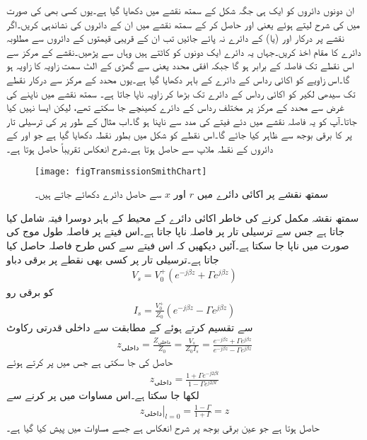 ان دونوں دائروں کو ایک ہی جگہ شکل  کے سمتھ نقشے میں دکھایا گیا ہے۔یوں کسی بھی  کی صورت میں  کی شرح لیتے ہوئے  یعنی  اور  حاصل کر کے  سمتھ نقشے میں ان کے دائروں کی نشاندہی کریں۔اگر نقشے پر درکار  اور (یا)  کے دائرے نہ پائے جائیں تب ان کے قریبی قیمتوں کے دائروں سے مطلوبہ دائرے کا مقام اخذ کریں۔جہاں یہ دائرے  ایک دونوں کو کاٹتے ہیں وہاں سے   پڑھیں۔نقشے  کے مرکز  سے  اس نقطے تک فاصلہ  کے برابر ہو گا جبکہ افقی محدد یعنی  سے گھڑی کے الٹ سمت زاویہ  کا زاویہ ہو گا۔اس زاویے کو اکائی رداس کے دائرے کے باہر دکھایا گیا ہے۔یوں محدد کے مرکز سے درکار نقطے تک سیدھی لکیر کو اکائی رداس کے دائرے تک بڑھا کر زاویہ ناپا جاتا ہے۔ سمتھ نقشے میں  ناپنے کی غرض سے محدد کے مرکز  پر مختلف رداس کے دائرے کھینچے جا سکتے تھے، لیکن ایسا نہیں کیا جاتا۔آپ کو یہ فاصلہ نقشے میں دئے فیتے کی مدد سے ناپنا ہو گا۔اب مثال کے طور پر  کی ترسیلی تار پر  کا برقی بوجھ  سے ظاہر کیا جائے گا۔اس نقطے کو شکل میں بطور نقطہ  دکھایا گیا ہے جو  اور  کے دائروں کے نقطہ ملاپ سے حاصل ہوتا ہے۔شرح انعکاس تقریباً   حاصل ہوتا ہے۔
\begin{figure}
\centering
\texttt{[image: figTransmissionSmithChart]}
\caption{سمتھ نقشے پر اکائی دائرے میں $r$ اور $x$ سے حاصل دائرے دکھائے جاتے ہیں۔}
\label{شکل_ترسیلی_سمتھ-نقشہ_پ}
\end{figure}

سمتھ نقشہ مکمل کرنے کی خاطر اکائی دائرے کے  محیط کے باہر دوسرا فیتہ شامل کیا جاتا ہے جس سے ترسیلی تار پر فاصلہ ناپا جاتا ہے۔اس فیتے پر فاصلہ طول موج  کی صورت میں ناپا جا سکتا ہے۔آئیں دیکھیں کہ اس فیتے سے کس طرح فاصلہ حاصل کیا جاتا ہے۔ترسیلی تار پر کسی بھی نقطے پر برقی دباو
\begin{align*}
V_s=V_0^+ \left(e^{-j\beta z}+\Gamma e^{j \beta z} \right)
\end{align*}
کو برقی رو
\begin{align*}
I_s =\frac{V_0^+}{Z_0}\left(e^{-j\beta z}-\Gamma e^{j \beta z} \right)
\end{align*}
سے تقسیم کرتے ہوئے  کے مطابقت سے داخلی قدرتی رکاوٹ
\begin{align*}
z_{\text{داخلی}} = \frac{Z_{\text{داخلی}}}{Z_0}=\frac{V_s}{Z_0 I_s}=\frac{e^{-j\beta z}+\Gamma e^{j \beta z} }{e^{-j\beta z}-\Gamma e^{j \beta z} }
\end{align*}
حاصل کی جا سکتی ہے جس میں  پر کرتے ہوئے
\begin{align}\label{مساوات_ترسیلی_داخلی_رکاوٹ_سمتھ_الف}
z_{\text{داخلی}} =\frac{1+\Gamma e^{-j 2\beta l}}{1-\Gamma e^{j 2\beta l}}
\end{align}
لکھا جا سکتا ہے۔اس مساوات میں  پر کرنے سے
\begin{align}\label{مساوات_ترسیلی_داخلی_رکاوٹ_سمتھ_ب}
\left. z_{\text{داخلی}} \right|_{l=0}=\frac{1-\Gamma}{1+\Gamma} = z
\end{align}
حاصل ہوتا ہے جو عین برقی بوجھ پر شرح انعکاس ہے جسے مساوات  میں پیش کیا گیا ہے۔

